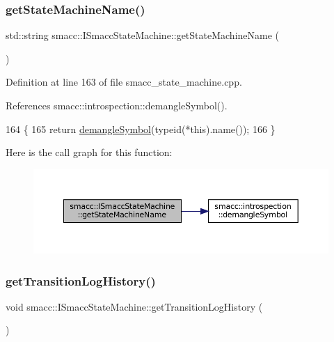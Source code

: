 \subsubsection{\texorpdfstring{get\+State\+Machine\+Name()}{getStateMachineName()}}
{\footnotesize\ttfamily std\+::string smacc\+::\+I\+Smacc\+State\+Machine\+::get\+State\+Machine\+Name (\begin{DoxyParamCaption}{ }\end{DoxyParamCaption})}



Definition at line 163 of file smacc\+\_\+state\+\_\+machine.\+cpp.



References smacc\+::introspection\+::demangle\+Symbol().


\begin{DoxyCode}
164 \{
165     \textcolor{keywordflow}{return} \hyperlink{namespacesmacc_1_1introspection_a2f495108db3e57604d8d3ff5ef030302}{demangleSymbol}(\textcolor{keyword}{typeid}(*this).name());
166 \}
\end{DoxyCode}
Here is the call graph for this function\+:
\nopagebreak
\begin{figure}[H]
\begin{center}
\leavevmode
\includegraphics[width=350pt]{classsmacc_1_1ISmaccStateMachine_a2d0b1742f17dd77d5df217153e8b5259_cgraph}
\end{center}
\end{figure}
\mbox{\label{classsmacc_1_1ISmaccStateMachine_ae7c08fc2addf8ee4785f721050e6a763}} 
\subsubsection{\texorpdfstring{get\+Transition\+Log\+History()}{getTransitionLogHistory()}\hspace{0.1cm}{\footnotesize\ttfamily [1/2]}}
{\footnotesize\ttfamily void smacc\+::\+I\+Smacc\+State\+Machine\+::get\+Transition\+Log\+History (\begin{DoxyParamCaption}{ }\end{DoxyParamCaption})}



